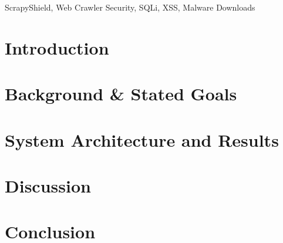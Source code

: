\maketitle

\begin{abstract}
  
\end{abstract}

\begin{IEEEkeywords}
  ScrapyShield, Web Crawler Security, SQLi, XSS, Malware Downloads
\end{IEEEkeywords}

\section{Introduction}


\section{Background \& Stated Goals}


\section{System Architecture and Results}


\section{Discussion}


\section{Conclusion}



\nocite{*}



